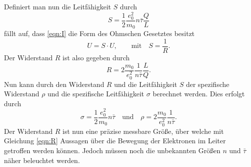 Definiert man nun die Leitfähigkeit $S$ durch
\begin{equation*}
    S=\frac{1}{2}\frac{e_0^2}{m_0}n\bar{\tau}\frac{Q}{L}
\end{equation*}
fällt auf, dass \eqref{eqn:I} die Form des Ohmschen Gesetztes besitzt
\begin{equation*}
    U=S\cdot U, \qquad \text{mit}\quad S=\frac{1}{R}.
\end{equation*}
Der Widerstand $R$ ist also gegeben durch
\begin{equation}
    R=2\frac{m_0}{e_0^2}\frac{1}{n\bar{\tau}}\frac{L}{Q}. \label{eqn:R}
\end{equation}
Nun kann durch den Widerstand $R$ und die Leitfähigkeit $S$ der spezifische Widerstand $\rho$ und
die spezifische Leitfähigkeit $\sigma$ berechnet werden. Dies erfolgt durch
\begin{equation*}
    \sigma=\frac{1}{2}\frac{e_0^2}{m_0}n\bar{\tau} 
    \quad \text{und} \quad
    \rho=2\frac{m_0}{e_0^2}\frac{1}{n\bar{\tau}}.
\end{equation*}
Der Widerstand $R$ ist nun eine präzise messbare Größe, über welche mit Gleichung \ref{eqn:R} Aussagen
über die Bewegung der Elektronen im Leiter getroffen werden können. Jedoch müssen noch die unbekannten
Größen $n$ und $\bar{\tau}$ näher beleuchtet werden.
